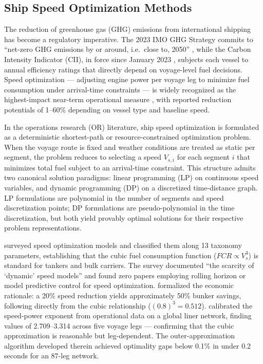 \documentclass[review]{elsarticle}
\begin{document}
\subsection{Ship Speed Optimization Methods}
\label{sec:lit-methods}

The reduction of greenhouse gas (GHG) emissions from international shipping has become a regulatory imperative. The 2023 IMO GHG Strategy commits to ``net-zero GHG emissions by or around, i.e.\ close to, 2050'' \cite{IMO2023}, while the Carbon Intensity Indicator (CII), in force since January 2023 \cite{Tadros2023}, subjects each vessel to annual efficiency ratings that directly depend on voyage-level fuel decisions. Speed optimization --- adjusting engine power per voyage leg to minimize fuel consumption under arrival-time constraints --- is widely recognized as the highest-impact near-term operational measure \cite{Bouman2017}, with reported reduction potentials of 1--60\% depending on vessel type and baseline speed.

In the operations research (OR) literature, ship speed optimization is formulated as a deterministic shortest-path or resource-constrained optimization problem. When the voyage route is fixed and weather conditions are treated as static per segment, the problem reduces to selecting a speed $V_{s,i}$ for each segment $i$ that minimizes total fuel subject to an arrival-time constraint. This structure admits two canonical solution paradigms: linear programming (LP) on continuous speed variables, and dynamic programming (DP) on a discretized time-distance graph. LP formulations are polynomial in the number of segments and speed discretization points; DP formulations are pseudo-polynomial in the time discretization, but both yield provably optimal solutions for their respective problem representations.

\cite{Psaraftis2013} surveyed speed optimization models and classified them along 13 taxonomy parameters, establishing that the cubic fuel consumption function ($FCR \propto V_s^3$) is standard for tankers and bulk carriers. The survey documented ``the scarcity of `dynamic' speed models'' and found zero papers employing rolling horizon or model predictive control for speed optimization. \cite{Ronen2011} formalized the economic rationale: a 20\% speed reduction yields approximately 50\% bunker savings, following directly from the cubic relationship ($(0.8)^3 = 0.512$). \cite{Wang2012} calibrated the speed-power exponent from operational data on a global liner network, finding values of 2.709--3.314 across five voyage legs --- confirming that the cubic approximation is reasonable but leg-dependent. The outer-approximation algorithm developed therein achieved optimality gaps below 0.1\% in under 0.2 seconds for an 87-leg network.
\end{document}
